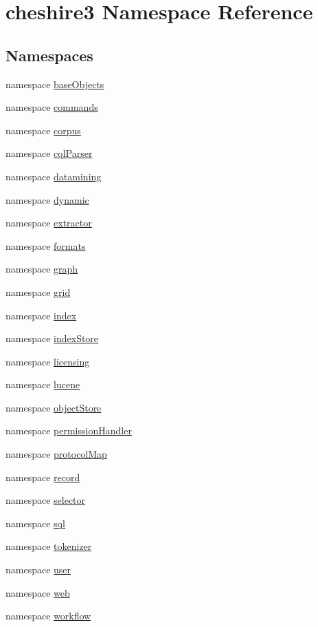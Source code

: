 \hypertarget{namespacecheshire3}{\section{cheshire3 Namespace Reference}
\label{namespacecheshire3}
}
\subsection*{Namespaces}
\begin{DoxyCompactItemize}
\item 
namespace \hyperlink{namespacecheshire3_1_1base_objects}{base\-Objects}
\item 
namespace \hyperlink{namespacecheshire3_1_1commands}{commands}
\item 
namespace \hyperlink{namespacecheshire3_1_1corpus}{corpus}
\item 
namespace \hyperlink{namespacecheshire3_1_1cql_parser}{cql\-Parser}
\item 
namespace \hyperlink{namespacecheshire3_1_1datamining}{datamining}
\item 
namespace \hyperlink{namespacecheshire3_1_1dynamic}{dynamic}
\item 
namespace \hyperlink{namespacecheshire3_1_1extractor}{extractor}
\item 
namespace \hyperlink{namespacecheshire3_1_1formats}{formats}
\item 
namespace \hyperlink{namespacecheshire3_1_1graph}{graph}
\item 
namespace \hyperlink{namespacecheshire3_1_1grid}{grid}
\item 
namespace \hyperlink{namespacecheshire3_1_1index}{index}
\item 
namespace \hyperlink{namespacecheshire3_1_1index_store}{index\-Store}
\item 
namespace \hyperlink{namespacecheshire3_1_1licensing}{licensing}
\item 
namespace \hyperlink{namespacecheshire3_1_1lucene}{lucene}
\item 
namespace \hyperlink{namespacecheshire3_1_1object_store}{object\-Store}
\item 
namespace \hyperlink{namespacecheshire3_1_1permission_handler}{permission\-Handler}
\item 
namespace \hyperlink{namespacecheshire3_1_1protocol_map}{protocol\-Map}
\item 
namespace \hyperlink{namespacecheshire3_1_1record}{record}
\item 
namespace \hyperlink{namespacecheshire3_1_1selector}{selector}
\item 
namespace \hyperlink{namespacecheshire3_1_1sql}{sql}
\item 
namespace \hyperlink{namespacecheshire3_1_1tokenizer}{tokenizer}
\item 
namespace \hyperlink{namespacecheshire3_1_1user}{user}
\item 
namespace \hyperlink{namespacecheshire3_1_1web}{web}
\item 
namespace \hyperlink{namespacecheshire3_1_1workflow}{workflow}
\end{DoxyCompactItemize}
